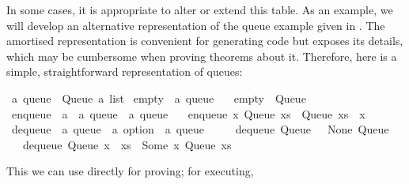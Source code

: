 \begin{isabellebody}
\begin{isamarkuptext}
  In some cases, it is appropriate to alter or extend this table.  As
  an example, we will develop an alternative representation of the
  queue example given in .  The amortised
  representation is convenient for generating code but exposes its
   details, which may be cumbersome when proving
  theorems about it.  Therefore, here is a simple, straightforward
  representation of queues:%
\end{isamarkuptext}%
\isamarkuptrue%
%
\isadelimquote
%
\endisadelimquote
%
\isatagquote
{}\isamarkupfalse%
\ {\isacharprime}a\ queue\ {\isacharequal}\ Queue\ {\isachardoublequoteopen}{\isacharprime}a\ list{\isachardoublequoteclose}\isanewline
\isanewline
{}\isamarkupfalse%
\ empty\ {\isacharcolon}{\isacharcolon}\ {\isachardoublequoteopen}{\isacharprime}a\ queue{\isachardoublequoteclose}\ \isanewline
\ \ {\isachardoublequoteopen}empty\ {\isacharequal}\ Queue\ {\isacharbrackleft}{\isacharbrackright}{\isachardoublequoteclose}\isanewline
\isanewline
{}\isamarkupfalse%
\ enqueue\ {\isacharcolon}{\isacharcolon}\ {\isachardoublequoteopen}{\isacharprime}a\ {\isasymRightarrow}\ {\isacharprime}a\ queue\ {\isasymRightarrow}\ {\isacharprime}a\ queue{\isachardoublequoteclose}\ \isanewline
\ \ {\isachardoublequoteopen}enqueue\ x\ {\isacharparenleft}Queue\ xs{\isacharparenright}\ {\isacharequal}\ Queue\ {\isacharparenleft}xs\ {\isacharat}\ {\isacharbrackleft}x{\isacharbrackright}{\isacharparenright}{\isachardoublequoteclose}\isanewline
\isanewline
{}\isamarkupfalse%
\ dequeue\ {\isacharcolon}{\isacharcolon}\ {\isachardoublequoteopen}{\isacharprime}a\ queue\ {\isasymRightarrow}\ {\isacharprime}a\ option\ {\isasymtimes}\ {\isacharprime}a\ queue{\isachardoublequoteclose}\ \isanewline
\ \ \ \ {\isachardoublequoteopen}dequeue\ {\isacharparenleft}Queue\ {\isacharbrackleft}{\isacharbrackright}{\isacharparenright}\ {\isacharequal}\ {\isacharparenleft}None{\isacharcomma}\ Queue\ {\isacharbrackleft}{\isacharbrackright}{\isacharparenright}{\isachardoublequoteclose}\isanewline
\ \ {\isacharbar}\ {\isachardoublequoteopen}dequeue\ {\isacharparenleft}Queue\ {\isacharparenleft}x\ {\isacharhash}\ xs{\isacharparenright}{\isacharparenright}\ {\isacharequal}\ {\isacharparenleft}Some\ x{\isacharcomma}\ Queue\ xs{\isacharparenright}{\isachardoublequoteclose}%
\endisatagquote
{\isafoldquote}%
%
\isadelimquote
%
\endisadelimquote
%
\begin{isamarkuptext}%
\noindent This we can use directly for proving;  for executing,

\end{isamarkuptext}
\end{isabellebody}
